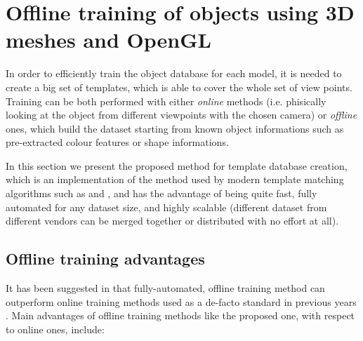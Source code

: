 \section{Offline training of objects using 3D meshes and OpenGL}
In order to efficiently train the object database for each model, it is needed
to create a big set of templates, which is able to cover the whole set of view
points. Training can be both performed with either \emph{online} methods (i.e.
phisically looking at the object from different viewpoints with the chosen
camera) or \emph{offline} ones, which build the dataset starting from known
object informations such as pre-extracted colour features or shape informations.

In this section we present the proposed method for template database
creation, which is an implementation of the method used by modern template
matching algorithms such as \cite{TODO} and \cite{TODO}, and
has the advantage of being quite fast, fully automated for any dataset size,
and highly scalable (different dataset from different vendors can be merged
together or distributed with no effort at all).

\subsection{Offline training advantages}
It has been suggested in \cite{TODO} that fully-automated, offline training method can
outperform online training methods used as a de-facto standard
in previous years \cite{TODO}. Main advantages of offline training methods like
the proposed one, with respect
to online ones, include:

